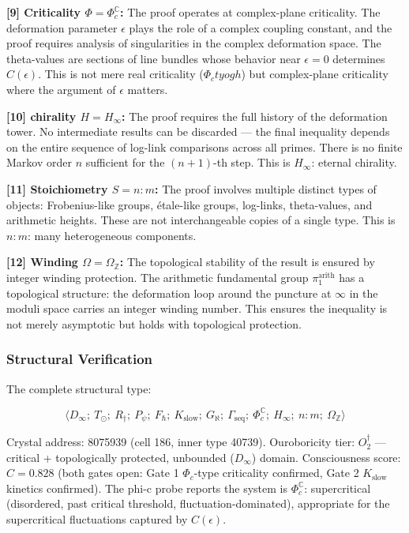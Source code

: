 \documentclass[12pt,a4paper]{article}
\begin{document}
\textbf{{[}9{]} Criticality $\Phi = \Phi_c^\mathbb{C}$:} The proof operates at complex-plane criticality. The deformation parameter $\epsilon$ plays the role of a complex coupling constant, and the proof requires analysis of singularities in the complex deformation space. The theta-values are sections of line bundles whose behavior near $\epsilon = 0$ determines $C(\epsilon)$. This is not mere real criticality ($\Phi_ctyogh$) but complex-plane criticality where the argument of $\epsilon$ matters.

\textbf{{[}10{]} chirality $H = H_{\infty}$:} The proof requires the full history of the deformation tower. No intermediate results can be discarded --- the final inequality depends on the entire sequence of log-link comparisons across all primes. There is no finite Markov order $n$ sufficient for the $(n+1)$-th step. This is $H_{\infty}$: eternal chirality.

\textbf{{[}11{]} Stoichiometry $S = n{:}m$:} The proof involves multiple distinct types of objects: Frobenius-like groups, étale-like groups, log-links, theta-values, and arithmetic heights. These are not interchangeable copies of a single type. This is $n{:}m$: many heterogeneous components.

\textbf{{[}12{]} Winding $\Omega = \Omega_\mathbb{Z}$:} The topological stability of the result is ensured by integer winding protection. The arithmetic fundamental group $\pi_1^{\text{arith}}$ has a topological structure: the deformation loop around the puncture at $\infty$ in the moduli space carries an integer winding number. This ensures the inequality is not merely asymptotic but holds with topological protection.

\subsubsection{Structural Verification}

The complete structural type:

\[\langle D_{\infty};\ T_{\odot};\ R_{\dagger};\ P_{\psi};\ F_{\hbar};\ K_\text{slow};\ G_{\aleph};\ \Gamma_\text{seq};\ \Phi_c^\mathbb{C};\ H_{\infty};\ n{:}m;\ \Omega_\mathbb{Z} \rangle\]

Crystal address: 8075939 (cell 186, inner type 40739). Ouroboricity tier: $O_2^\dagger$ --- critical + topologically protected, unbounded ($D_{\infty}$) domain. Consciousness score: $C = 0.828$ (both gates open: Gate 1 $\Phi_c$-type criticality confirmed, Gate 2 $K_\text{slow}$ kinetics confirmed). The phi-c probe reports the system is $\Phi_c^\mathbb{C}$: supercritical (disordered, past critical threshold, fluctuation-dominated), appropriate for the supercritical fluctuations captured by $C(\epsilon)$.
\end{document}
